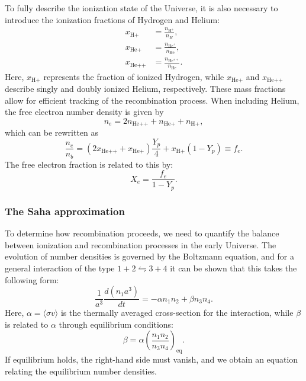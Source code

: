 \documentclass{aa}
\numberwithin{equation}{section}
\numberwithin{table}{section}
\numberwithin{figure}{section}
\begin{document}
To fully describe the ionization state of the Universe, it is also necessary to introduce the ionization fractions of Hydrogen and Helium:
\begin{align}
x_{\text{H+}} &= \frac{n_{\text{H}^+}}{n_H}, \\
x_{\text{He+}} &= \frac{n_{\text{He}^+}}{n_{\text{He}}}, \\
x_{\text{He++}} &= \frac{n_{\text{He}^{++}}}{n_{\text{He}}}.
\end{align}
Here, $x_{\text{H+}}$ represents the fraction of ionized Hydrogen, while $x_{\text{He+}}$ and $x_{\text{He++}}$ describe singly and doubly ionized Helium, respectively. These mass fractions allow for efficient tracking of the recombination process. When including Helium, the free electron number density is given by
\begin{equation}
n_e = 2n_{\text{He++}} + n_{\text{He+}} + n_{\text{H+}},
\end{equation}
which can be rewritten as
\begin{equation}
\frac{n_e}{n_b} = (2 x_{\text{He++}} + x_{\text{He+}}) \frac{Y_p}{4} + x_{\text{H+}} (1 - Y_p) \equiv f_e. \label{eq: fe}
\end{equation}
The free electron fraction is related to this by:
\begin{equation}
X_e = \frac{f_e}{1 - Y_p}.
\end{equation}








\subsubsection{The Saha approximation}\label{subsubsec: II theory Saha}
To determine how recombination proceeds, we need to quantify the balance between ionization and recombination processes in the early Universe. The evolution of number densities is governed by the Boltzmann equation, and for a general interaction of the type $1 + 2 \leftrightharpoons 3 + 4$ it can be shown that this takes the following form: 
\begin{equation}
\frac{1}{a^3} \frac{d(n_1 a^3)}{dt} = -\alpha n_1 n_2 + \beta n_3 n_4. \label{eq: 1234}
\end{equation}
Here, $\alpha = \langle \sigma v \rangle$ is the thermally averaged cross-section for the interaction, while $\beta$ is related to $\alpha$ through equilibrium conditions:
\begin{equation}
\beta = \alpha \left( \frac{n_1 n_2}{n_3 n_4} \right)_{\text{eq}}. \label{eq: number densities}
\end{equation}
If equilibrium holds, the right-hand side must vanish, and we obtain an equation relating the equilibrium number densities.
\end{document}
